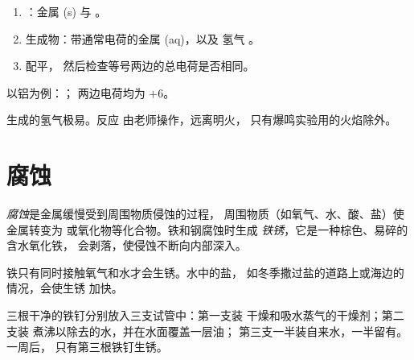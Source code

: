 \begin{method}[写出金属与酸反应的方程式]\label{met:g9:metals-acids-corrosion:write}
\begin{enumerate}
  \item {}：金属 (s) 与  。
  \item 生成物：带通常电荷的金属 (aq)，以及
        氢气 。
  \item 配平，
        然后检查等号两边的总电荷是否相同。
\end{enumerate}
以铝为例：；
两边电荷均为 $+6$。
\end{method}

\begin{safety}{}
生成的氢气极易。反应
由老师操作，远离明火，
只有爆鸣实验用的火焰除外。
\end{safety}

\section{腐蚀}

\begin{definition}[腐蚀与铁锈]\label{def:g9:metals-acids-corrosion:corrosion}
\emph{腐蚀}是金属缓慢受到周围物质侵蚀的过程，
周围物质（如氧气、水、酸、盐）使金属转变为
或氧化物等化合物。铁和钢腐蚀时生成
\emph{铁锈}，它是一种棕色、易碎的含水氧化铁，
会剥落，使侵蚀不断向内部深入。
\end{definition}

\begin{proposition}[铁生锈需要什么]\label{prop:g9:metals-acids-corrosion:needs}
铁只有同时接触氧气和水才会生锈。水中的盐，
如冬季撒过盐的道路上或海边的情况，会使生锈
加快。
\end{proposition}

\begin{inthelab}[三根铁钉，一周]
三根干净的铁钉分别放入三支试管中：第一支装
干燥和吸水蒸气的干燥剂；第二支装
煮沸以除去的水，并在水面覆盖一层油；
第三支一半装自来水，一半留有。一周后，
只有第三根铁钉生锈。
\end{inthelab}

